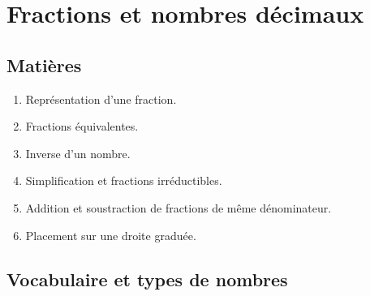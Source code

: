 \documentclass[../../syllabus_1.tex]{subfiles}
\begin{document}
\chapter{Fractions et nombres décimaux}
 
\section*{Matières}
\begin{enumerate}[label=\textbf{\arabic*.}]
    \item Représentation d'une fraction.
    \item Fractions équivalentes.
    \item Inverse d'un nombre.
    \item Simplification et fractions irréductibles.
    \item Addition et soustraction de fractions de même dénominateur.
    \item Placement sur une droite graduée.
\end{enumerate}

\section{Vocabulaire et types de nombres}
\end{document}
